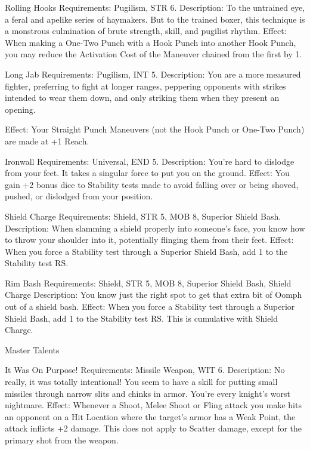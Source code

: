 \documentclass[oneside,11pt,english]{book}
\begin{document}
 

Rolling Hooks 
Requirements: Pugilism, STR 6. 
Description: To the untrained eye, a feral and apelike series of haymakers. But to the trained boxer, this 
technique is a monstrous culmination of brute strength, skill, and pugilist rhythm. 
Effect: When making a One-Two Punch with a Hook Punch into another Hook Punch, you may reduce 
the Activation Cost of the Maneuver chained from the first by 1. 

 

 

Long Jab 
Requirements: Pugilism, INT 5. 
Description: You are a more measured fighter, preferring to fight at longer ranges, peppering opponents 
with strikes intended to wear them down, and only striking them when they present an opening. 


Effect: Your Straight Punch Maneuvers (not the Hook Punch or One-Two Punch) are made at +1 Reach. 

 

Ironwall 
Requirements: Universal, END 5. 
Description: You’re hard to dislodge from your feet. It takes a singular force to put you on the ground. 
Effect: You gain +2 bonus dice to Stability tests made to avoid falling over or being shoved, pushed, or 
dislodged from your position. 

 

 

Shield Charge 
Requirements: Shield, STR 5, MOB 8, Superior Shield Bash. 
Description: When slamming a shield properly into someone’s face, you know how to throw your 
shoulder into it, potentially flinging them from their feet. 
Effect: When you force a Stability test through a Superior Shield Bash, add 1 to the Stability test RS. 

 

Rim Bash 
Requirements: Shield, STR 5, MOB 8, Superior Shield Bash, Shield Charge 
Description: You know just the right spot to get that extra bit of Oomph out of a shield bash. 
Effect: When you force a Stability test through a Superior Shield Bash, add 1 to the Stability test RS. 
This is cumulative with Shield Charge. 

 

 

Master Talents 

 

It Was On Purpose! 
Requirements: Missile Weapon, WIT 6. 
Description: No really, it was totally intentional! You seem to have a skill for putting small missiles 
through narrow slits and chinks in armor. You’re every knight’s worst nightmare. 
Effect: Whenever a Shoot, Melee Shoot or Fling attack you make hits an opponent on a Hit Location 
where the target’s armor has a Weak Point, the attack inflicts +2 damage. This does not apply to Scatter 
damage, except for the primary shot from the weapon. 
\end{document}
